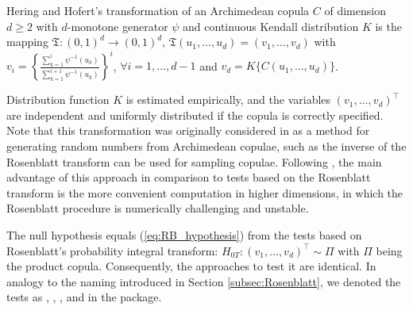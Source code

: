 \begin{definition}
	Hering and Hofert's transformation of an Archimedean copula $C$ of dimension $d\geq2$ with $d$-monotone generator $\psi$ and continuous Kendall distribution $K$ is the mapping $\mathfrak{T}: (0,1)^d \rightarrow (0,1)^d$, $\mathfrak{T}(u_1, \ldots, u_d) = (v_1, \dots, v_d)$ with $v_i = \left\{\frac{\sum_{k=1}^{i}\psi^{-1}(u_k)}{\sum_{k=1}^{i+1}\psi^{-1}(u_k)}\right\}^{i}$, $\forall i=1, \dots, d-1$ and $v_d = K\{C(u_1, \ldots, u_d)\}$.
\end{definition}
Distribution function $K$ is estimated empirically, and the variables $(v_1, \ldots, v_d)^{\top}$ are independent and uniformly distributed if the copula is correctly specified. Note that this transformation was originally considered in \cite{wu2007simulating} as a method for generating random numbers from Archimedean copulae, such as the inverse of the Rosenblatt transform can be used for sampling copulae. Following \cite{Arch2015goodness}, the main advantage of this approach in comparison to tests based on the Rosenblatt transform is the more convenient computation in higher dimensions, in which the Rosenblatt procedure is numerically challenging and unstable.

The null hypothesis equals (\ref{eq:RB_hypothesis}) from the tests based on Rosenblatt's probability integral transform: $H_{0T}: (v_1, \dots, v_d)^\top\sim \Pi$ with $\Pi$ being the product copula. Consequently, the approaches to test it are identical. In analogy to the naming introduced in Section \ref{subsec:Rosenblatt}, we denoted the tests as , , , and  in the package.\bk

